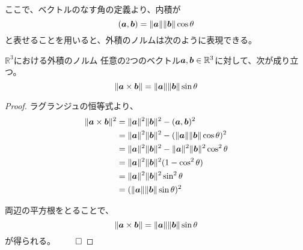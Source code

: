 \documentclass[../../../topic_linear-algebra]{subfiles}
\begin{document}
ここで、ベクトルのなす角の定義より、内積が
\begin{equation*}
  (\vb*{a}, \vb*{b}) = \|\vb*{a}\| \|\vb*{b}\| \cos \theta
\end{equation*}
と表せることを用いると、外積のノルムは次のように表現できる。

\begin{theorem}{$\mathbb{R}^3$における外積のノルム}
  任意の2つのベクトル$\vb*{a}, \vb*{b} \in \mathbb{R}^3$に対して、次が成り立つ。
  \begin{equation*}
    \| \vb*{a} \times \vb*{b} \| = \| \vb*{a} \| \| \vb*{b} \| \sin \theta
  \end{equation*}
\end{theorem}

\begin{proof}
  ラグランジュの恒等式より、
  \begin{align*}
    \| \vb*{a} \times \vb*{b} \|^2
    &= \| \vb*{a} \|^2 \| \vb*{b} \|^2 - ( \vb*{a}, \vb*{b} )^2 \\
    &= \| \vb*{a} \|^2 \| \vb*{b} \|^2 - (\| \vb*{a} \| \| \vb*{b} \| \cos \theta)^2 \\
    &= \| \vb*{a} \|^2 \| \vb*{b} \|^2 - \| \vb*{a} \|^2 \| \vb*{b} \|^2 \cos^2 \theta \\
    &= \| \vb*{a} \|^2 \| \vb*{b} \|^2 (1 - \cos^2 \theta) \\
    &= \| \vb*{a} \|^2 \| \vb*{b} \|^2 \sin^2 \theta \\
    &= (\| \vb*{a} \| \| \vb*{b} \| \sin \theta)^2
  \end{align*}
  
  両辺の平方根をとることで、
  \begin{equation*}
    \| \vb*{a} \times \vb*{b} \| = \| \vb*{a} \| \| \vb*{b} \| \sin \theta
  \end{equation*}
  が得られる。 $\qed$
\end{proof}

\begin{mindflow}
\end{mindflow}
\end{document}
